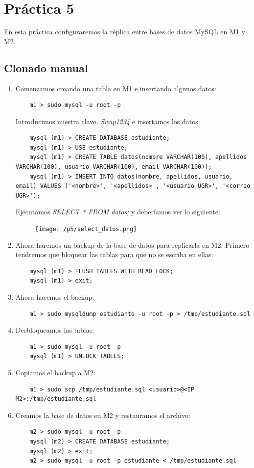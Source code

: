 \documentclass[12pt,spanish]{article}
\begin{document}
\section{Práctica 5}
En esta práctica configuraremos la réplica entre bases de datos MySQL en M1 y M2.

\subsection{Clonado manual}
\begin{enumerate}
	\item Comenzamos creando una tabla en M1 e insertando algunos datos:
	\begin{lstlisting}
	m1 > sudo mysql -u root -p
	\end{lstlisting}
	Introducimos nuestra clave, \emph{Swap1234} e insertamos los datos:
	\begin{lstlisting}
	mysql (m1) > CREATE DATABASE estudiante;
	mysql (m1) > USE estudiante;
	mysql (m1) > CREATE TABLE datos(nombre VARCHAR(100), apellidos VARCHAR(100), usuario VARCHAR(100), email VARCHAR(100));
	mysql (m1) > INSERT INTO datos(nombre, apellidos, usuario, email) VALUES ('<nombre>', '<apellidos>', '<usuario UGR>', '<correo UGR>');
	\end{lstlisting}
	Ejecutamos \emph{SELECT * FROM datos;} y deberíamos ver lo siguiente:
	\begin{figure}[H]
		\centering
		\texttt{[image: /p5/select\_datos.png]}
	\end{figure}
	\item Ahora haremos un backup de la base de datos para replicarla en M2. Primero tendremos que bloquear las tablas para que no se escriba en ellas:
	\begin{lstlisting}
	mysql (m1) > FLUSH TABLES WITH READ LOCK;
	mysql (m1) > exit;
	\end{lstlisting}
	\item Ahora hacemos el backup:
	\begin{lstlisting}
	m1 > sudo mysqldump estudiante -u root -p > /tmp/estudiante.sql
	\end{lstlisting}
	\item Desbloqueamos las tablas:
	\begin{lstlisting}
	m1 > sudo mysql -u root -p
	mysql (m1) > UNLOCK TABLES;
	\end{lstlisting}
	\item Copiamos el backup a M2:
	\begin{lstlisting}
	m1 > sudo scp /tmp/estudiante.sql <usuario>@<IP M2>:/tmp/estudiante.sql
	\end{lstlisting}
	\item Creamos la base de datos en M2 y restauramos el archivo:
	\begin{lstlisting}
	m2 > sudo mysql -u root -p
	mysql (m2) > CREATE DATABASE estudiante;
	mysql (m2) > exit;
	m2 > sudo mysql -u root -p estudiante < /tmp/estudiante.sql
	\end{lstlisting}
\end{enumerate}
\end{document}
